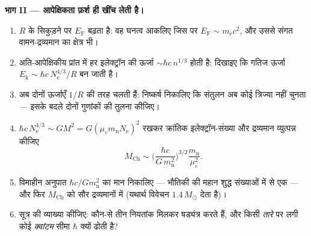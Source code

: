 \begin{problem}
\medskip\noindent\textbf{भाग II --- आपेक्षिकता फ़र्श ही खींच
लेती है।}
\begin{enumerate}[resume]
  \item $R$ के सिकुड़ने पर $E_{\text{F}}$ बढ़ता है: वह घनत्व
        आकलिए जिस पर $E_{\text{F}} \sim m_{\text{e}}c^2$, और उससे
        संगत वामन-द्रव्यमान का क्षेत्र भी।
  \item अति-आपेक्षिकीय प्रांत में हर इलेक्ट्रॉन की ऊर्जा
        $\sim\hbar c\,n^{1/3}$ होती है: दिखाइए कि गतिज ऊर्जा
        $E_{\text{k}} \sim \hbar c\,N_{\text{e}}^{4/3}/R$ बन जाती है।
  \item अब दोनों ऊर्जाएँ $1/R$ की तरह चलती हैं: निष्कर्ष निकालिए
        कि संतुलन अब कोई त्रिज्या नहीं चुनता --- इसके बदले दोनों
        गुणांकों की तुलना कीजिए।
  \item $\hbar c\,N_{\text{e}}^{4/3} \sim
        GM^2 = G(\mu_em_{\text{n}}N_{\text{e}})^2$ रखकर क्रांतिक
        इलेक्ट्रॉन-संख्या और द्रव्यमान व्युत्पन्न कीजिए
        \[
        M_{\text{Ch}} \sim
        \Big(\frac{\hbar c}{G\,m_{\text{n}}^2}\Big)^{3/2}
        \frac{m_{\text{n}}}{\mu_e^2} .
        \]
  \item विमाहीन अनुपात $\hbar c/Gm_{\text{n}}^2$ का मान निकालिए
        --- भौतिकी की महान शुद्ध संख्याओं में से एक --- और फिर
        $M_{\text{Ch}}$ को सौर द्रव्यमानों में (यथार्थ विवेचन
        $1.4\,M_\odot$ देता है)।
  \item सूत्र की व्याख्या कीजिए: कौन-से तीन नियतांक मिलकर षड्यंत्र
        करते हैं, और किसी \emph{तारे} पर लगी कोई \emph{क्वांटम}
        सीमा $\hbar$ क्यों ढोती है?
\end{enumerate}


\end{problem}
